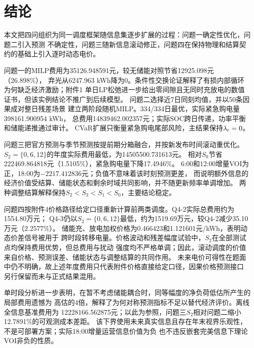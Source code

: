 \section{结论}

本文把四问组织为同一调度框架随信息集逐步扩展的过程：问题一确定性优化，问题二引入预测
不确定性，问题三随新信息滚动修正，问题四在保持物理和结算契约的基础上引入逐时动态电价。

问题一的MILP费用为35126.948591元，较无储能对照节省12925.098元（26.898\%），
弃光从6247.963 kWh降为0。条件性交换论证解释了有损内部循环为何缺乏经济激励；附件1
单日LP松弛进一步给出零间隙且无同时充放电的数值证书，但该实例结论不推广到后续模型。
问题二选择近7日同刻均值，并以50条因果成对整日残差场景
建立两阶段随机MILP。334/334日最优，实际紧急购电量398161.900954 kWh，
总费用14839462.002357元；实际SOC跨日传递，功率平衡和储能递推通过审计。
CVaR扩展只衡量紧急购电尾部风险，主结果保持$\lambda_{\rm r}=0$。

问题三把官方预测与季节预测按提前期分箱融合，并按新发布时间滚动重优化。
$S_2=\{0,6,12\}$的年度实际费用最低，为14505500.731613元。
相对$S_0$节省222469.864818元（1.5105\%），紧急购电量下降17.4946\%。
6:00和12:00增量VOI为正，18:00为$-2217.412836$元；负值不意味着该时刻预测更差，
而说明额外信息的经济价值受结算、储能状态和剩余时域共同影响，并不随更新频率单调增加。
两种调整结算解释保持$S_2<S_3<S_1<S_0$，主要结论稳定。

问题四按附件4价格路径给定口径重新计算前两类调度。Q4-2实际总费用约为1554.80万元；
Q4-3仍以$S_2=\{0,6,12\}$最低，约为1519.69万元，较Q4-2减少35.10万元（2.2577\%）。
储能充、放电加权价格为0.466423和1.121601元/kWh，表明动态价差信号被用于
跨时段转移电量。价格波动和残差幅度试验中，$S_2$在全部测试点均保持费用优势，但总费用与扰动
强度均不严格单调；因此，滚动调度的价值来自价格、预测误差、储能状态与调整结算的共同作用。
未来电价可得性在题面中仍不明确，故上述年度费用只代表附件价格直接给定口径，因果价格预测接口
另行保留而未与正式结果混用。

单时段分析进一步表明，在暂不考虑储能耦合时，同等幅度的净负荷低估所产生的局部费用遗憾为
高估的4倍，解释了为何对称预测指标不足以替代经济评价。离线全信息基准费用为
12228166.562875元；以此为参照，问题三$S_2$相对问题二缩小12.7891\%的可观测成本差距。
该下界使用未来真实信息且存在年末视界乐观性，不是可部署方案；实际18:00增量运营信息价值为负
也不违反嵌套完美信息下理论VOI非负的性质。
